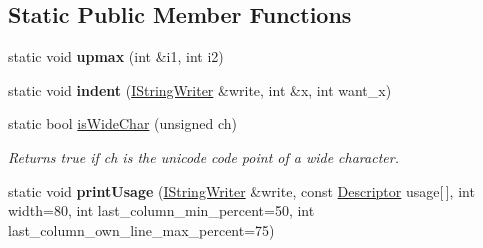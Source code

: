 \subsection*{\-Static \-Public \-Member \-Functions}
\begin{DoxyCompactItemize}
\item 
\hypertarget{structoption_1_1_print_usage_implementation_a0680dd84366df82398e30e4ccbd27ac0}{static void {\bfseries upmax} (int \&i1, int i2)}\label{structoption_1_1_print_usage_implementation_a0680dd84366df82398e30e4ccbd27ac0}

\item 
\hypertarget{structoption_1_1_print_usage_implementation_a4136c574bba35ea1f478e0b6d7022367}{static void {\bfseries indent} (\hyperlink{structoption_1_1_print_usage_implementation_1_1_i_string_writer}{\-I\-String\-Writer} \&write, int \&x, int want\-\_\-x)}\label{structoption_1_1_print_usage_implementation_a4136c574bba35ea1f478e0b6d7022367}

\item 
static bool \hyperlink{structoption_1_1_print_usage_implementation_a41bfaabdf21e68877f3030d36acc0798}{is\-Wide\-Char} (unsigned ch)
\begin{DoxyCompactList}\small\item\em \-Returns true if ch is the unicode code point of a wide character. \end{DoxyCompactList}\item 
\hypertarget{structoption_1_1_print_usage_implementation_ab38c4198c5cccea2ccd992c8e014df70}{static void {\bfseries print\-Usage} (\hyperlink{structoption_1_1_print_usage_implementation_1_1_i_string_writer}{\-I\-String\-Writer} \&write, const \hyperlink{structoption_1_1_descriptor}{\-Descriptor} usage\mbox{[}$\,$\mbox{]}, int width=80, int last\-\_\-column\-\_\-min\-\_\-percent=50, int last\-\_\-column\-\_\-own\-\_\-line\-\_\-max\-\_\-percent=75)}\label{structoption_1_1_print_usage_implementation_ab38c4198c5cccea2ccd992c8e014df70}

\end{DoxyCompactItemize}


